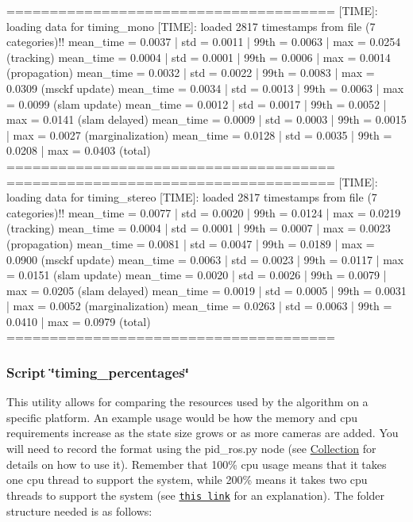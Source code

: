 \begin{DoxyCode}
======================================
[TIME]: loading data for timing\_mono
[TIME]: loaded 2817 timestamps from file (7 categories)!!
mean\_time = 0.0037 | std = 0.0011 | 99th = 0.0063  | max = 0.0254 (tracking)
mean\_time = 0.0004 | std = 0.0001 | 99th = 0.0006  | max = 0.0014 (propagation)
mean\_time = 0.0032 | std = 0.0022 | 99th = 0.0083  | max = 0.0309 (msckf update)
mean\_time = 0.0034 | std = 0.0013 | 99th = 0.0063  | max = 0.0099 (slam update)
mean\_time = 0.0012 | std = 0.0017 | 99th = 0.0052  | max = 0.0141 (slam delayed)
mean\_time = 0.0009 | std = 0.0003 | 99th = 0.0015  | max = 0.0027 (marginalization)
mean\_time = 0.0128 | std = 0.0035 | 99th = 0.0208  | max = 0.0403 (total)
======================================
======================================
[TIME]: loading data for timing\_stereo
[TIME]: loaded 2817 timestamps from file (7 categories)!!
mean\_time = 0.0077 | std = 0.0020 | 99th = 0.0124  | max = 0.0219 (tracking)
mean\_time = 0.0004 | std = 0.0001 | 99th = 0.0007  | max = 0.0023 (propagation)
mean\_time = 0.0081 | std = 0.0047 | 99th = 0.0189  | max = 0.0900 (msckf update)
mean\_time = 0.0063 | std = 0.0023 | 99th = 0.0117  | max = 0.0151 (slam update)
mean\_time = 0.0020 | std = 0.0026 | 99th = 0.0079  | max = 0.0205 (slam delayed)
mean\_time = 0.0019 | std = 0.0005 | 99th = 0.0031  | max = 0.0052 (marginalization)
mean\_time = 0.0263 | std = 0.0063 | 99th = 0.0410  | max = 0.0979 (total)
======================================
\end{DoxyCode}


\hypertarget{eval-timing_eval-ov-timing-percentages}{}\subsubsection{Script \char`\"{}timing\+\_\+percentages\char`\"{}}\label{eval-timing_eval-ov-timing-percentages}
This utility allows for comparing the resources used by the algorithm on a specific platform. An example usage would be how the memory and cpu requirements increase as the state size grows or as more cameras are added. You will need to record the format using the {\ttfamily pid\+\_\+ros.\+py} node (see \hyperlink{eval-timing_eval-ov-timing-collection}{Collection} for details on how to use it). Remember that 100\% cpu usage means that it takes one cpu thread to support the system, while 200\% means it takes two cpu threads to support the system (see \href{https://superuser.com/a/457634/707974}{\tt this link} for an explanation). The folder structure needed is as follows\+:


